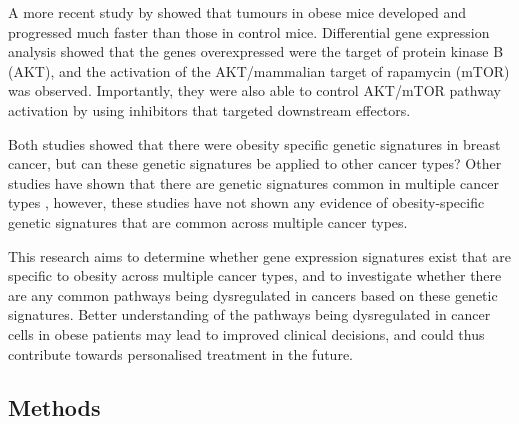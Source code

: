\documentclass[12pt, a4paper]{article}
\begin{document}
A more recent study by \citet{Fuentes-Mattei2014} showed that tumours in obese mice developed and progressed much faster than those in control mice.
Differential gene expression analysis showed that the genes overexpressed were the target of protein kinase B (AKT), and the activation of the AKT/mammalian target of rapamycin (mTOR) was observed.
Importantly, they were also able to control AKT/mTOR pathway activation by using inhibitors that targeted  downstream effectors.

Both studies showed that there were obesity specific genetic signatures in breast cancer, but can these genetic signatures be applied to other cancer types?
Other studies have shown that there are genetic signatures common in multiple cancer types \citep{Alexandrov2013,Lawrence2014}, however, these studies have not shown any evidence of obesity-specific genetic signatures that are common across multiple cancer types.

This research aims to determine whether gene expression signatures exist that are specific to obesity across multiple cancer types, and to investigate whether there are any common pathways being dysregulated in cancers based on these genetic signatures.
Better understanding of the pathways being dysregulated in cancer cells in obese patients may lead to improved clinical decisions, and could thus contribute towards personalised treatment in the future.


\vspace{-11pt}

\subsection*{Methods}
\end{document}
